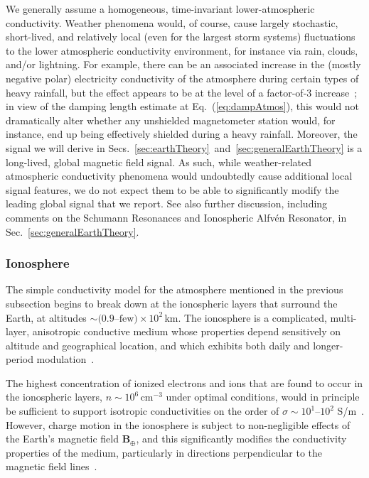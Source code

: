 \documentclass[amsmath,amssymb,aps,10pt,prd,letterpaper,nofootinbib,balancelastpage,notitlepage,superscriptaddress,twocolumn,floatfix]{revtex4-2}
\newcommand{\secref}[2][]{Sec{#1}.~\ref{#2}}		%
\renewcommand{\eqref}[2][]{Eq{#1}.~(\ref{eq:#2})}	%
\begin{document}
We generally assume a homogeneous, time-invariant lower-atmospheric conductivity. 
Weather phenomena would, of course, cause largely stochastic, short-lived, and relatively local (even for the largest storm systems) fluctuations to the lower atmospheric conductivity environment, for instance via rain, clouds, and/or lightning.
For example, there can be an associated increase in the (mostly negative polar) electricity conductivity of the atmosphere during certain types of heavy rainfall, but the effect appears to be at the level of a factor-of-3 increase~\cite{atmos11111195}; in view of the damping length estimate at \eqref{dampAtmos}, this would not dramatically alter whether any unshielded magnetometer station would, for instance, end up being effectively shielded during a heavy rainfall.
Moreover, the signal we will derive in \secref[s]{sec:earthTheory}~and~\ref{sec:generalEarthTheory} is a long-lived, global magnetic field signal.
As such, while weather-related atmospheric conductivity phenomena would undoubtedly cause additional local signal features, we do not expect them to be able to significantly modify the leading global signal that we report.
See also further discussion, including comments on the Schumann Resonances and Ionospheric Alfv\'en Resonator, in \secref{sec:generalEarthTheory}.

\subsubsection{Ionosphere}
\label{sec:ionosphere}

The simple conductivity model for the atmosphere mentioned in the previous subsection begins to break down at the ionospheric layers that surround the Earth, at altitudes $\sim (0.9$--$\text{few})\times 10^2$\,km. 
The ionosphere is a complicated, multi-layer, anisotropic conductive medium whose properties depend sensitively on altitude and geographical location, and which exhibits both daily and longer-period modulation~\cite{Simoes:2012asf,Takeda:1985hcf,GM118}.

The highest concentration of ionized electrons and ions that are found to occur in the ionospheric layers, $n\sim 10^{6}\,\text{cm}^{-3}$ under optimal conditions, would in principle be sufficient to support isotropic conductivities on the order of $\sigma \sim 10^{1}$--$10^{2}\,$\,S/m~\cite{Takeda:1985hcf,GM118}.
However, charge motion in the ionosphere is subject to non-negligible effects of the Earth's magnetic field $\bm{B}_{\oplus}$, and this significantly modifies the conductivity properties of the medium, particularly in directions perpendicular to the magnetic field lines~\cite{Takeda:1985hcf,GM118}.
\end{document}
